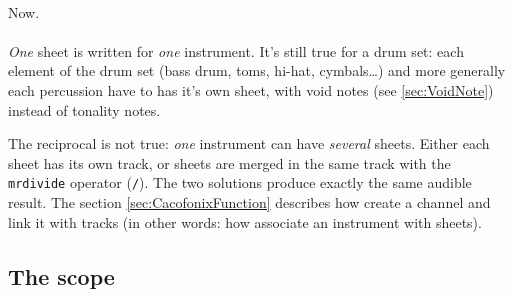 \documentclass{article}
\begin{document}
\paragraph{}

Now.

\paragraph{}

\emph{One} sheet is written for \emph{one} instrument. It's still true for a drum set: each element of the drum set (bass drum, toms, hi-hat, cymbals\dots) and more generally each percussion have to has it's own sheet, with void notes (see \ref{sec:VoidNote}) instead of tonality notes.

The reciprocal is not true: \emph{one} instrument can have \emph{several} sheets. Either each sheet has its own track, or sheets are merged in the same track with the \lstinline!mrdivide! operator (\lstinline!/!). The two solutions produce exactly the same audible result. The section \ref{sec:CacofonixFunction} describes how create a channel and link it with tracks (in other words: how associate an instrument with sheets).

\subsection{The scope}
\label{sec:scope}
\end{document}
